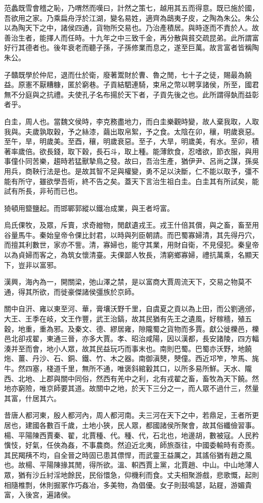 范蠡既雪會稽之恥，乃喟然而嘆曰，計然之策七，越用其五而得意。既已施於國，吾欲用之家。乃乘扁舟浮於江湖，變名易姓，適齊為鴟夷子皮，之陶為朱公。朱公以為陶天下之中，諸侯四通，貨物所交易也。乃治產積居。與時逐而不責於人。故善治生者，能擇人而任時。十九年之中三致千金，再分散與貧交疏昆弟。此所謂富好行其德者也。後年衰老而聽子孫，子孫修業而息之，遂至巨萬。故言富者皆稱陶朱公。

子贛既學於仲尼，退而仕於衛，廢著鬻財於曹、魯之閒，七十子之徒，賜最為饒益。原憲不厭糟糠，匿於窮巷。子貢結駟連騎，束帛之幣以聘享諸侯，所至，國君無不分庭與之抗禮。夫使孔子名布揚於天下者，子貢先後之也。此所謂得埶而益彰者乎。

白圭，周人也。當魏文侯時，李克務盡地力，而白圭樂觀時變，故人棄我取，人取我與。夫歲孰取穀，予之絲漆，繭出取帛絮，予之食。太陰在卯，穰，明歲衰惡。至午，旱，明歲美。至酉，穰，明歲衰惡。至子，大旱，明歲美，有水。至卯，積著率歲倍。欲長錢，取下穀，長石斗，取上種。能薄飲食，忍嗜欲，節衣服，與用事僮仆同苦樂，趨時若猛獸摯鳥之發。故曰，吾治生產，猶伊尹、呂尚之謀，孫吳用兵，商鞅行法是也。是故其智不足與權變，勇不足以決斷，仁不能以取予，彊不能有所守，雖欲學吾術，終不告之矣。蓋天下言治生祖白圭。白圭其有所試矣，能試有所長，非茍而已也。

猗頓用盬鹽起。而邯鄲郭縱以鐵冶成業，與王者埒富。

烏氏倮牧，及眾，斥賣，求奇繒物，閒獻遺戎王。戎王什倍其償，與之畜，畜至用谷量馬牛。秦始皇帝令倮比封君，以時與列臣朝請。而巴蜀寡婦清，其先得丹穴，而擅其利數世，家亦不訾。清，寡婦也，能守其業，用財自衛，不見侵犯。秦皇帝以為貞婦而客之，為筑女懷清臺。夫倮鄙人牧長，清窮鄉寡婦，禮抗萬乘，名顯天下，豈非以富邪。

漢興，海內為一，開關梁，弛山澤之禁，是以富商大賈周流天下，交易之物莫不通，得其所欲，而徙豪傑諸侯彊族於京師。

關中自汧、雍以東至河、華，膏壤沃野千里，自虞夏之貢以為上田，而公劉適邠，大王、王季在岐，文王作豐，武王治鎬，故其民猶有先王之遺風，好稼穡，殖五穀，地重，重為邪。及秦文、德、繆居雍，隙隴蜀之貨物而多賈。獻公徙櫟邑，櫟邑北卻戎翟，東通三晉，亦多大賈。孝、昭治咸陽，因以漢都，長安諸陵，四方輻湊并至而會，地小人眾，故其民益玩巧而事末也。南則巴蜀。巴蜀亦沃野，地饒炧、薑、丹沙、石、銅、鐵、竹、木之器。南御滇僰，僰僮。西近邛笮，笮馬、旄牛。然四塞，棧道千里，無所不通，唯褒斜綰轂其口，以所多易所鮮。天水、隴西、北地、上郡與關中同俗，然西有羌中之利，北有戎翟之畜，畜牧為天下饒。然地亦窮險，唯京師要其道。故關中之地，於天下三分之一，而人眾不過什三，然量其富，什居其六。

昔唐人都河東，殷人都河內，周人都河南。夫三河在天下之中，若鼎足，王者所更居也，建國各數百千歲，土地小狹，民人眾，都國諸侯所聚會，故其俗纖儉習事。楊、平陽陳西賈秦、翟，北賈種、代。種、代，石北也，地邊胡，數被寇。人民矜懻忮，好氣，任俠為姦，不事農商。然迫近北夷，師旅亟往，中國委輸時有奇羨。其民羯羠不均，自全晉之時固已患其僄悍，而武靈王益厲之，其謠俗猶有趙之風也。故楊、平陽陳掾其閒，得所欲。溫、軹西賈上黨，北賈趙、中山。中山地薄人眾，猶有沙丘紂淫地餘民，民俗懁急，仰機利而食。丈夫相聚游戲，悲歌慨，起則相隨椎剽，休則掘冢作巧姦冶，多美物，為倡優。女子則鼓鳴瑟，跕屣，游媚貴富，入後宮，遍諸侯。

